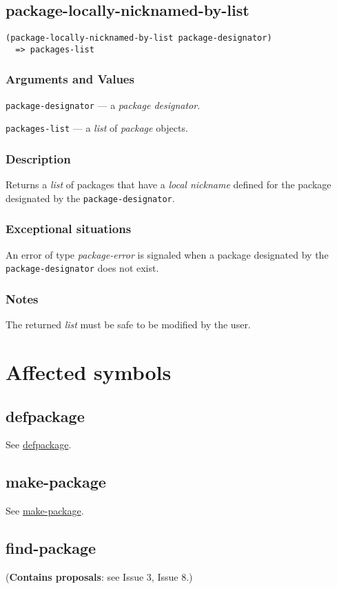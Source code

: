 \documentclass[11pt]{article}
\begin{document}
\subsection{package-locally-nicknamed-by-list}
\label{sec:org46c6eb5}
\begin{verbatim}
(package-locally-nicknamed-by-list package-designator)
  => packages-list
\end{verbatim}
\subsubsection{Arguments and Values}
\label{sec:org6a51bb1}
\texttt{package-designator} --- a \emph{package designator}.

\texttt{packages-list} --- a \emph{list} of \emph{package} objects.
\subsubsection{Description}
\label{sec:org7372d2b}
Returns a \emph{list} of packages that have a \emph{local nickname} defined for the package
designated by the \texttt{package-designator}.
\subsubsection{Exceptional situations}
\label{sec:org2d0313a}
An error of type \emph{package-error} is signaled when a package designated by the
\texttt{package-designator} does not exist.
\subsubsection{Notes}
\label{sec:org775e9ac}
The returned \emph{list} must be safe to be modified by the user.
\section{Affected symbols}
\label{sec:org2ed01d8}
\subsection{defpackage}
\label{sec:org99b0820}
See \hyperref[sec:org645e8ec]{defpackage}.
\subsection{make-package}
\label{sec:org2257b65}
See \hyperref[sec:org7d2b6a0]{make-package}.
\subsection{find-package}
\label{sec:org73129b5}
(\textbf{Contains proposals}: see Issue 3, Issue 8.)
\end{document}
